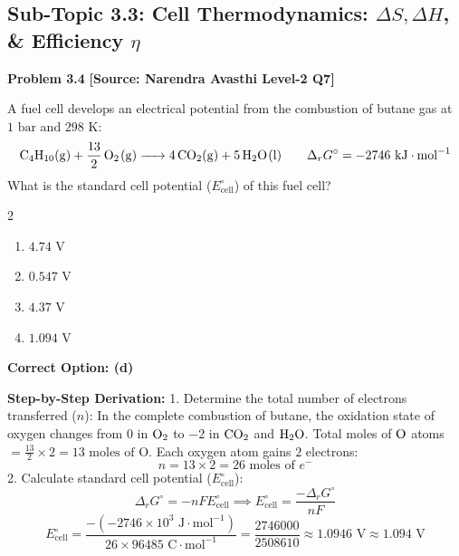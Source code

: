 \subsection{Sub-Topic 3.3: Cell Thermodynamics: $\Delta S, \Delta H$, \& Efficiency $\eta$}

\begin{problembox}
\textbf{Problem 3.4} \hfill \textbf{[Source: Narendra Avasthi Level-2 Q7]}

A fuel cell develops an electrical potential from the combustion of butane gas at $1\text{ bar}$ and $298\text{ K}$:
\begin{equation*}
    \ce{C4H10(g) + \frac{13}{2} O2(g) -> 4CO2(g) + 5H2O(l)} \qquad \Delta_r G^\circ = -2746\text{ kJ}\cdot\text{mol}^{-1}
\end{equation*}
What is the standard cell potential ($E^\circ_{\text{cell}}$) of this fuel cell?
\begin{multicols}{2}
\begin{enumerate}[label=(\alph*)]
    \item $4.74\text{ V}$
    \item $0.547\text{ V}$
    \item $4.37\text{ V}$
    \item $1.094\text{ V}$
\end{enumerate}
\end{multicols}
\end{problembox}
\begin{solution}
\textbf{Correct Option: (d)}

\textbf{Step-by-Step Derivation:}
1. Determine the total number of electrons transferred ($n$):
In the complete combustion of butane, the oxidation state of oxygen changes from $0$ in $\ce{O2}$ to $-2$ in $\ce{CO2}$ and $\ce{H2O}$.
Total moles of $\ce{O}$ atoms $= \frac{13}{2} \times 2 = 13\text{ moles of O}$.
Each oxygen atom gains $2$ electrons:
\begin{equation*}
    n = 13 \times 2 = 26\text{ moles of } e^-
\end{equation*}
2. Calculate standard cell potential ($E^\circ_{\text{cell}}$):
\begin{equation*}
    \Delta_r G^\circ = -n F E^\circ_{\text{cell}} \implies E^\circ_{\text{cell}} = \frac{-\Delta_r G^\circ}{n F}
\end{equation*}
\begin{equation*}
    E^\circ_{\text{cell}} = \frac{-(-2746 \times 10^3\text{ J}\cdot\text{mol}^{-1})}{26 \times 96485\text{ C}\cdot\text{mol}^{-1}} = \frac{2746000}{2508610} \approx 1.0946\text{ V} \approx 1.094\text{ V}
\end{equation*}
\end{solution}

